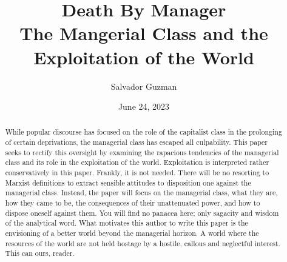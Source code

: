 \documentclass[12pt]{article}
\title{
 Death By Manager \\
 \large The Mangerial Class and the Exploitation of the World}
\author{Salvador Guzman}
\date{June 24, 2023}
\begin{document}
\maketitle
\pagebreak

\begin{abstract}
    While popular discourse has focused on the role of the capitalist class in the prolonging of certain deprivations, the managerial class has escaped all culpability.
    This paper seeks to rectify this oversight by examining the rapacious tendencies of the managerial class and its role in the exploitation of the world.
    Exploitation is interpreted rather conservatively in this paper.
    Frankly, it is not needed.
    There will be no resorting to Marxist definitions to extract sensible attitudes to disposition one against the managerial class. Instead, the paper will focus on the managerial class, what they are, how they came to be, the consequences of their unattenuated power, and how to dispose oneself against them.
    You will find no panacea here; only sagacity and wisdom of the analytical word. What motivates this author to write this paper is the envisioning of a better world beyond the managerial horizon.
    A world where the resources of the world are not held hostage by a hostile, callous and neglectful interest.
    This can ours, reader.
\end{abstract}
\pagebreak
\tableofcontents
\pagebreak
\end{document}
